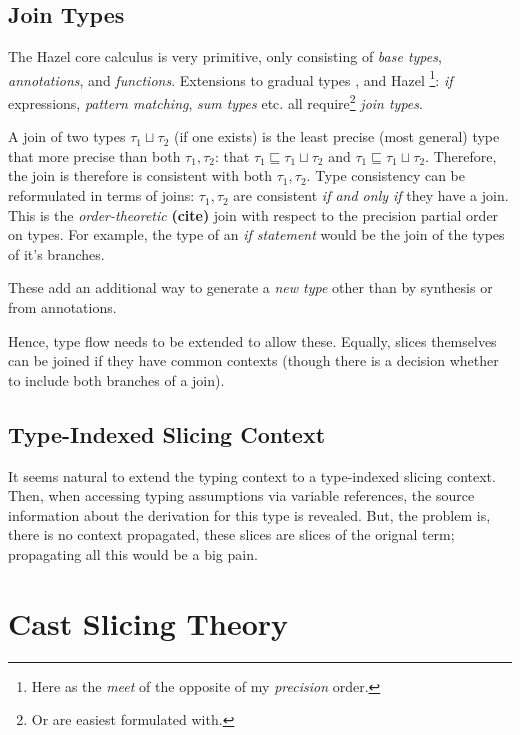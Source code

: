 \subsection{Join Types}\label{sec:JoinTypesTheory}
The Hazel core calculus is very primitive, only consisting of \textit{base types}, \textit{annotations}, and \textit{functions}. Extensions to gradual types \cite{GradualJoins}, and Hazel \cite{MarkedLocalisation}\footnote{Here as the \textit{meet} of the opposite of my \textit{precision} order.}: \textit{if} expressions, \textit{pattern matching}, \textit{sum types} etc. all require\footnote{Or are easiest formulated with.} \textit{join types}. 

A join of two types $\tau_1 \sqcup \tau_2$ (if one exists) is the least precise (most general) type that more precise than both $\tau_1, \tau_2$: that $\tau_1 \sqsubseteq \tau_1 \sqcup \tau_2$ and $\tau_1 \sqsubseteq \tau_1 \sqcup \tau_2$. Therefore, the join is therefore is consistent with both $\tau_1, \tau_2$. Type consistency can be reformulated in terms of joins: $\tau_1, \tau_2$ are consistent \textit{if and only if} they have a join. This is the \textit{order-theoretic} \textbf{(cite)} join with respect to the precision partial order on types. 
For example, the type of an \textit{if statement} would be the join of the types of it's branches.

These add an additional way to generate a \textit{new type} other than by synthesis or from annotations. 

Hence, type flow needs to be extended to allow these. Equally, slices themselves can be joined if they have common contexts (though there is a decision whether to include both branches of a join).

\subsection{Type-Indexed Slicing Context}
It seems natural to extend the typing context to a type-indexed slicing context. Then, when accessing typing assumptions via variable references, the source information about the derivation for this type is revealed. But, the problem is, there is no context propagated, these slices are slices of the orignal term; propagating all this would be a big pain.

\section{Cast Slicing Theory}\label{sec:CastSlicingTheory}

